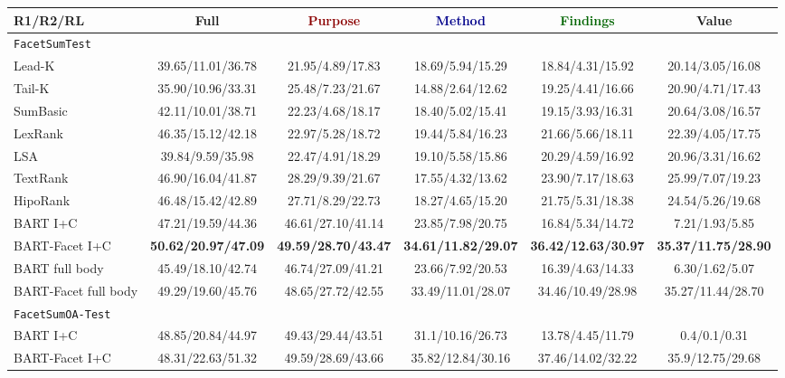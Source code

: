 \documentclass[11pt,a4paper]{article}
\newcommand{\ours}{\texttt{FacetSum}\xspace}
\newcommand{\absp}{\textcolor{darkred}{Purpose}\xspace}
\newcommand{\absm}{\textcolor{darkblue}{Method}\xspace}
\newcommand{\absf}{\textcolor{darkgreen}{Findings}\xspace}
\newcommand{\absv}{\textcolor{darkyellow}{Value}\xspace}
\begin{document}
\begin{table*}
    \centering
    \fontsize{8.2}{10}\selectfont 
    \renewcommand{\arraystretch}{1.25}
    \begin{tabular}{lccccc}
    \toprule\midrule
        \textbf{R1/R2/RL} & \textbf{Full} & \textbf{\absp} & \textbf{\absm} & \textbf{\absf} & \textbf{\absv} \\ 
        \midrule\midrule
        \multicolumn{6}{l}{\ours \texttt{Test}} \\ 
        \midrule
        Lead-K & 39.65/11.01/36.78 & 21.95/4.89/17.83 & 18.69/5.94/15.29 & 18.84/4.31/15.92 & 20.14/3.05/16.08 \\ 
        Tail-K & 35.90/10.96/33.31 & 25.48/7.23/21.67 & 14.88/2.64/12.62 & 19.25/4.41/16.66 & 20.90/4.71/17.43 \\ \midrule
        SumBasic & 42.11/10.01/38.71 & 22.23/4.68/18.17 & 18.40/5.02/15.41 & 19.15/3.93/16.31 & 20.64/3.08/16.57 \\ 
        LexRank & 46.35/15.12/42.18 & 22.97/5.28/18.72 & 19.44/5.84/16.23 & 21.66/5.66/18.11 & 22.39/4.05/17.75 \\ 
        LSA & 39.84/9.59/35.98 & 22.47/4.91/18.29 & 19.10/5.58/15.86 & 20.29/4.59/16.92 & 20.96/3.31/16.62 \\ 
        TextRank & 46.90/16.04/41.87 & 28.29/9.39/21.67 & 17.55/4.32/13.62 & 23.90/7.17/18.63 & 25.99/7.07/19.23 \\ 
        HipoRank & 46.48/15.42/42.89 & 27.71/8.29/22.73 & 18.27/4.65/15.20 & 21.75/5.31/18.38 & 24.54/5.26/19.68 \\ \midrule
        BART I+C & 47.21/19.59/44.36 & 46.61/27.10/41.14 & 23.85/7.98/20.75 & 16.84/5.34/14.72 & 7.21/1.93/5.85 \\ 
BART-Facet I+C & \textbf{50.62/20.97/47.09} & \textbf{49.59/28.70/43.47} & \textbf{34.61/11.82/29.07} & \textbf{36.42/12.63/30.97} & \textbf{35.37/11.75/28.90} \\ 
BART full body & 45.49/18.10/42.74 & 46.74/27.09/41.21 & 23.66/7.92/20.53 & 16.39/4.63/14.33 & 6.30/1.62/5.07 \\ 
BART-Facet full body & 49.29/19.60/45.76 & 48.65/27.72/42.55 & 33.49/11.01/28.07 & 34.46/10.49/28.98 & 35.27/11.44/28.70 \\ 
        \midrule
        \midrule
        \multicolumn{6}{l}{\ours \texttt{OA-Test}} \\ 
        \midrule
BART I+C & 
        48.85/20.84/44.97 & 49.43/29.44/43.51 & 31.1/10.16/26.73 & 13.78/4.45/11.79 & 0.4/0.1/0.31 \\
BART-Facet I+C & 
        48.31/22.63/51.32 & 49.59/28.69/43.66 & 35.82/12.84/30.16 & 37.46/14.02/32.22 & 35.9/12.75/29.68 \\
\bottomrule
    \end{tabular}
    \caption{Full results (Rouge-1/2/L) of different models on \ours. \textbf{Bold} text indicates the best scores on \ours test split in each column.}
    \label{table:model_performance_full}
\end{table*}
\end{document}
